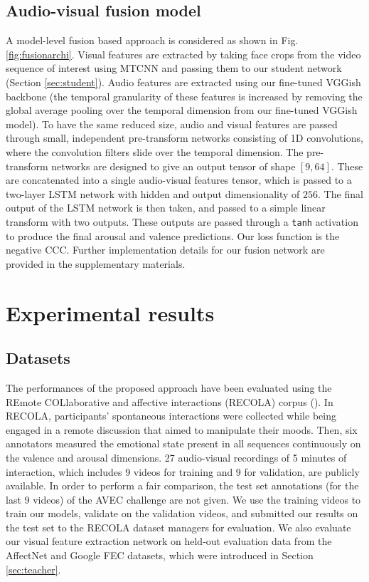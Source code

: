 \documentclass[times,twocolumn,final,authoryear]{elsarticle}
\begin{document}
	\subsection{Audio-visual fusion model}
	\label{sec:fusion}
	
	A model-level fusion based approach is considered as shown in Fig. \ref{fig:fusionarchi}. Visual features are extracted by taking face crops from the video sequence of interest using MTCNN and passing them to our student network (Section \ref{sec:student}). Audio features are extracted using our fine-tuned VGGish backbone (the temporal granularity of these features is increased by removing the global average pooling over the temporal dimension from our fine-tuned VGGish model). To have the same reduced size, audio and visual features are passed through small, independent pre-transform networks consisting of 1D convolutions, where the convolution filters slide over the temporal dimension. The pre-transform networks are designed to give an output tensor of shape $[9, 64]$. These are concatenated into a single audio-visual features tensor, which is passed to a two-layer LSTM network with hidden and output dimensionality of $256$. The final output of the LSTM network is then taken, and passed to a simple linear transform with two outputs. These outputs are passed through a \texttt{tanh} activation to produce the final arousal and valence predictions. Our loss function is the negative CCC. Further implementation details for our fusion network are provided in the supplementary materials.
	
	\section{Experimental results}
	\label{sec:results}
	
	\subsection{Datasets}
	\label{sec:datasets}
	The performances of the proposed approach have been evaluated using the REmote COLlaborative and affective interactions (RECOLA) corpus (\cite{recola}). In RECOLA, participants' spontaneous interactions were collected while being engaged in a remote discussion that aimed to manipulate their moods. Then, six annotators measured the emotional state present in all sequences continuously on the valence and arousal dimensions. 27 audio-visual recordings of 5 minutes of interaction, which includes 9 videos for training and 9 for validation, are publicly available. In order to perform a fair comparison, the test set annotations (for the last 9 videos) of the AVEC challenge are not given. We use the training videos to train our models, validate on the validation videos, and submitted our results on the test set to the RECOLA dataset managers for evaluation. We also evaluate our visual feature extraction network on held-out evaluation data from the AffectNet and Google FEC datasets, which were introduced in Section \ref{sec:teacher}.
	
\end{document}
